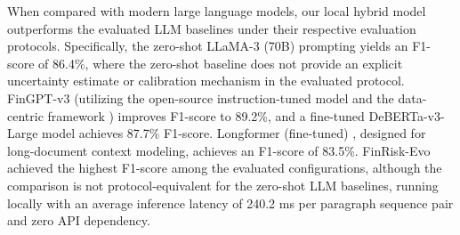 \documentclass[journal]{IEEEtran}
\begin{document}
When compared with modern large language models, our local hybrid model outperforms the evaluated LLM baselines under their respective evaluation protocols. Specifically, the zero-shot LLaMA-3 (70B) prompting \cite{llama3} yields an F1-score of 86.4\%, where the zero-shot baseline does not provide an explicit uncertainty estimate or calibration mechanism in the evaluated protocol. FinGPT-v3 (utilizing the open-source instruction-tuned model \cite{yang2023fingpt} and the data-centric framework \cite{li2023fingpt}) improves F1-score to 89.2\%, and a fine-tuned DeBERTa-v3-Large model \cite{deberta} achieves 87.7\% F1-score. Longformer (fine-tuned) \cite{beltagy2020longformer}, designed for long-document context modeling, achieves an F1-score of 83.5\%. FinRisk-Evo achieved the highest F1-score among the evaluated configurations, although the comparison is not protocol-equivalent for the zero-shot LLM baselines, running locally with an average inference latency of 240.2 ms per paragraph sequence pair and zero API dependency.

\begin{table}[h]
\centering
\caption{Quantitative Benchmarking Results on Financial Risk Classification (Values reported as $\pm$ represent approximate 95\% company-clustered bootstrap uncertainty interval half-widths with 1,000 resamples)}
\label{tab:compare}
\end{table}
\end{document}
